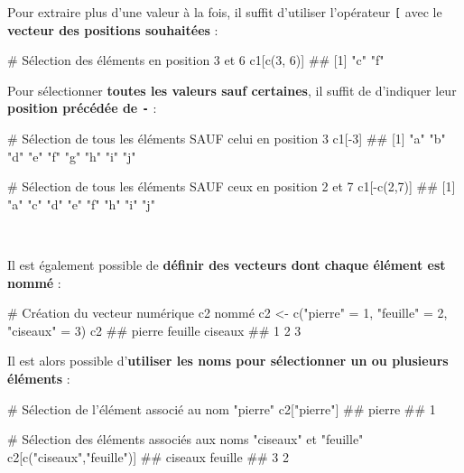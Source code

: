 \documentclass[12pt,twosided, notitlepage]{book}
\newenvironment{Shaded}{}{}
\newcommand{\KeywordTok}[1]{\textcolor[rgb]{0.00,0.00,1.00}{{#1}}}
\newcommand{\DecValTok}[1]{{#1}}
\newcommand{\StringTok}[1]{\textcolor[rgb]{0.00,0.50,0.50}{{#1}}}
\newcommand{\CommentTok}[1]{\textcolor[rgb]{0.00,0.50,0.00}{{#1}}}
\newcommand{\NormalTok}[1]{{#1}}
\renewenvironment{Shaded}{\begin{snugshade}}{\end{snugshade}}
\begin{document}
Pour extraire plus d'une valeur à la fois, il suffit d'utiliser
l'opérateur \texttt{{[}}\index{\texttt{[}|textbf} avec le
\textbf{vecteur des positions souhaitées} :

\begin{Shaded}
\begin{Highlighting}[]
\CommentTok{# Sélection des éléments en position 3 et 6}
\NormalTok{c1[}\KeywordTok{c}\NormalTok{(}\DecValTok{3}\NormalTok{, }\DecValTok{6}\NormalTok{)]}
  \NormalTok{## [1] "c" "f"}
\end{Highlighting}
\end{Shaded}

Pour sélectionner \textbf{toutes les valeurs sauf certaines}, il suffit
de d'indiquer leur \textbf{position précédée de
\texttt{-}}\index{\texttt{-}} :

\begin{Shaded}
\begin{Highlighting}[]
\CommentTok{# Sélection de tous les éléments SAUF celui en position 3}
\NormalTok{c1[-}\DecValTok{3}\NormalTok{]}
  \NormalTok{## [1] "a" "b" "d" "e" "f" "g" "h" "i" "j"}

\CommentTok{# Sélection de tous les éléments SAUF ceux en position 2 et 7}
\NormalTok{c1[-}\KeywordTok{c}\NormalTok{(}\DecValTok{2}\NormalTok{,}\DecValTok{7}\NormalTok{)]}
  \NormalTok{## [1] "a" "c" "d" "e" "f" "h" "i" "j"}
\end{Highlighting}
\end{Shaded}

~

Il est également possible de \textbf{définir des vecteurs dont chaque
élément est nommé} :

\begin{Shaded}
\begin{Highlighting}[]
\CommentTok{# Création du vecteur numérique c2 nommé}
\NormalTok{c2 <-}\StringTok{ }\KeywordTok{c}\NormalTok{(}\StringTok{"pierre"} \NormalTok{=}\StringTok{ }\DecValTok{1}\NormalTok{, }\StringTok{"feuille"} \NormalTok{=}\StringTok{ }\DecValTok{2}\NormalTok{, }\StringTok{"ciseaux"} \NormalTok{=}\StringTok{ }\DecValTok{3}\NormalTok{)}
\NormalTok{c2}
  \NormalTok{##  pierre feuille ciseaux }
  \NormalTok{##       1       2       3}
\end{Highlighting}
\end{Shaded}

Il est alors possible d'\textbf{utiliser les noms pour sélectionner un
ou plusieurs éléments} :

\begin{Shaded}
\begin{Highlighting}[]
\CommentTok{# Sélection de l'élément associé au nom "pierre"}
\NormalTok{c2[}\StringTok{"pierre"}\NormalTok{]}
  \NormalTok{## pierre }
  \NormalTok{##      1}

\CommentTok{# Sélection des éléments associés aux noms "ciseaux" et "feuille"}
\NormalTok{c2[}\KeywordTok{c}\NormalTok{(}\StringTok{"ciseaux"}\NormalTok{,}\StringTok{"feuille"}\NormalTok{)]}
  \NormalTok{## ciseaux feuille }
  \NormalTok{##       3       2}
\end{Highlighting}
\end{Shaded}
\end{document}
